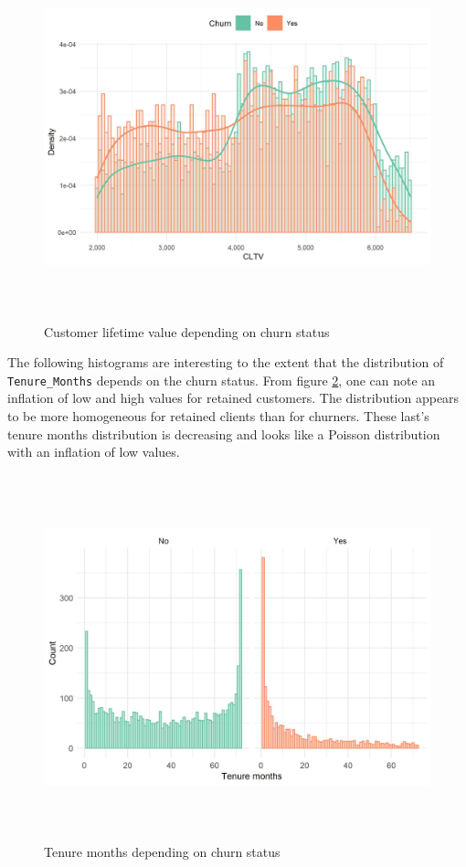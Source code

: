 \documentclass[
]{book}
\begin{document}
\begin{figure}

{\centering \includegraphics[width=450pt,height=300pt]{./imgs/cltv_churn_plot} 

}

\caption{Customer lifetime value depending on churn status}\label{fig:cltvchurn}
\end{figure}

The following histograms are interesting to the extent that the distribution of \texttt{Tenure\_Months} depends on the churn status. From figure \ref{fig:churndur}, one can note an inflation of low and high values for retained customers. The distribution appears to be more homogeneous for retained clients than for churners. These last's tenure months distribution is decreasing and looks like a Poisson distribution with an inflation of low values.

\begin{figure}

{\centering \includegraphics[width=500pt,height=300pt]{./imgs/duration_churn_plot} 

}

\caption{Tenure months depending on churn status}\label{fig:churndur}
\end{figure}
\end{document}
